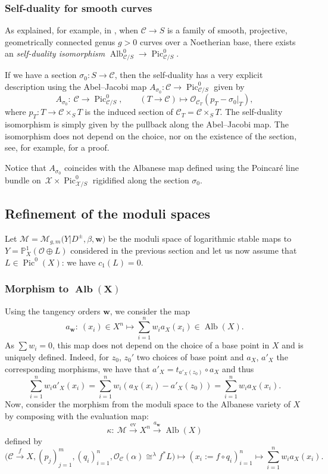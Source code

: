 \documentclass[pdftex]{sigma}
\newcommand{\ev}{\mathrm{ev}}
\newcommand{\Pic}{\operatorname{Pic}}
\newcommand{\Alb}{\operatorname{Alb}}
\newcommand{\bfw}{ {\boldsymbol w} }
\newcommand{\M}{\mathcal{M}}
\newcommand{\X}{\mathcal{X}}
\newcommand{\C}{\mathcal{C}}
\renewcommand{\O}{\mathcal{O}}
\numberwithin{equation}{section}
\theoremstyle{definition}
\begin{document}
\subsubsection{Self-duality for smooth curves} As explained, for example, in \cite[Section~9.5.26]{fantechi2006fundamental}, when $\C\to S$ is a family of smooth, projective, geometrically connected genus $g>0$
curves over a Noetherian base, there exists an \emph{self-duality isomorphism}
$\Alb^0_{\C\slash S}\to \Pic^0_{\C\slash S}$.

 If we have a section $\sigma_0\colon S\to \C$, then the self-duality has a very explicit description using the Abel--Jacobi map $A_{\sigma_0}\colon\C\to\Pic^0_{\C/S}$ given by
\[
 A_{\mathcal \sigma_0}\colon \ \C \longrightarrow \Pic^0_{\C\slash S},\qquad
 (T\to\C) \longmapsto \mathcal O_{\C_T}(p_T -\sigma_0\rvert_T),
\]
where $p_T\colon T\to\C\times_S T$ is the induced section of $\C_T=\C\times_S T$.
The self-duality isomorphism is simply given by the pullback along the Abel--Jacobi map. The isomorphism does not depend on the choice, nor on the existence of the section, see, for example, \cite{esteves2002autoduality} for a proof.

Notice that $A_{\sigma_0}$ coincides with the Albanese map defined using the Poincar\'e line bundle on~${\X\times\Pic^0_{\X\slash S}}$ rigidified along the section $\sigma_0$.

\subsection{Refinement of the moduli spaces}

Let $\M=\M_{g,m}\bigl(Y|D^\pm,\beta,\bfw\bigr)$ be the moduli space of logarithmic stable maps to $Y=\mathbb P_X^1(\O\oplus L)$ considered in the previous section and let us now assume that $L\in\Pic^0(X)$: we have $c_1(L)=0$.


\subsubsection[Morphism to Alb(X)]{Morphism to $\boldsymbol{\operatorname{Alb}(X)}$}
Using the tangency orders $\bfw$, we consider the map
\[ a_\bfw\colon \ (x_i)\in X^n\longmapsto\sum_{i=1}^n w_i a_X(x_i)\in\Alb(X). \]
As $\sum w_i=0$, this map does not depend on the choice of a base point in $X$ and is uniquely defined. Indeed, for $z_0$, $z_0'$ two choices of base point and $a_X$, $a'_X$ the corresponding morphisms, we have that $a'_X= t_{a'_X(z_0)}\circ a_X$ and thus
\[
 \sum_{i=1}^n w_i a'_X(x_i)= \sum_{i=1}^n w_i (a_X(x_i) -a'_X(z_0))= \sum_{i=1}^n w_i a_X(x_i).
\]
Now, consider the morphism from the moduli space to the Albanese variety of $X$ by composing with the evaluation map:
\[ \kappa\colon\ \M\xrightarrow{\ev} X^n\xrightarrow{a_\bfw} \Alb(X)\]
defined by
\[%
\bigl(\C\xrightarrow{f} X,(p_j)_{j=1}^m,(q_i)_{i=1}^n,\O_{\C}(\alpha)\cong^{\lambda} f^*L\bigr)\mapsto (x_i:=f\circ q_i)_{i=1}^n\mapsto \sum_{i=1}^n w_i a_X(x_i).
\]
\end{document}
